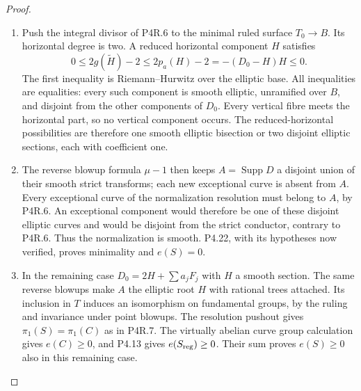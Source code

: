 \begin{proof}

\begin{enumerate}[label={$\langle1\rangle$\arabic*.},leftmargin=*]
\item Push the integral divisor of P4R.6 to
the minimal ruled surface $T_0\to B$.
Its horizontal degree is two. A reduced
horizontal component $H$ satisfies
\[
 0\le 2g(\widetilde H)-2
 \le 2p_a(H)-2
 =-(D_0-H)H\le0.
\]
The first inequality is
Riemann--Hurwitz over the elliptic
base. All inequalities are equalities:
every such component is smooth elliptic,
unramified over $B$, and disjoint from
the other components of $D_0$. Every
vertical fibre meets the horizontal
part, so no vertical component occurs.
The reduced-horizontal possibilities
are therefore one smooth elliptic
bisection or two disjoint elliptic
sections, each with coefficient one.

\item The reverse blowup formula $\mu-1$
then keeps $A=\operatorname{Supp}D$
a disjoint union of their smooth
strict transforms; each new exceptional
curve is absent from $A$. Every
exceptional curve of the normalization
resolution must belong to $A$, by
P4R.6. An exceptional component would
therefore be one of these disjoint
elliptic curves and would be disjoint
from the strict conductor, contrary
to P4R.6. Thus the normalization is
smooth. P4.22, with its hypotheses now
verified, proves minimality and
$e(S)=0$.

\item In the remaining case
$D_0=2H+\sum a_jF_j$ with $H$ a
smooth section. The same reverse
blowups make $A$ the elliptic root $H$
with rational trees attached. Its
inclusion in $T$ induces an
isomorphism on fundamental groups,
by the ruling and invariance under
point blowups. The resolution pushout
gives $\pi_1(S)=\pi_1(C)$ as in
P4R.7. The virtually abelian curve
group calculation gives $e(C)\ge0$,
and P4.13 gives $e(S_{\rm reg})\ge0$.
Their sum proves $e(S)\ge0$ also
in this remaining case.

\end{enumerate}
\end{proof}
